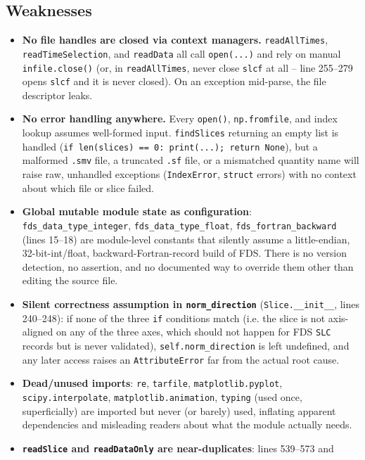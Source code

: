 \documentclass[11pt,a4paper]{report}
\begin{document}
\subsection{Weaknesses}
\begin{itemize}[nosep]
\item \textbf{No file handles are closed via context managers.} \texttt{readAllTimes},
\texttt{readTimeSelection}, and \texttt{readData} all call \texttt{open(...)} and rely on manual
\texttt{infile.close()} (or, in \texttt{readAllTimes}, never close \texttt{slcf} at all --
line 255--279 opens \texttt{slcf} and it is never closed). On an exception mid-parse, the file
descriptor leaks.
\item \textbf{No error handling anywhere.} Every \texttt{open()}, \texttt{np.fromfile}, and index
lookup assumes well-formed input. \texttt{findSlices} returning an empty list is handled
(\texttt{if len(slices) == 0: print(...); return None}), but a malformed \texttt{.smv} file, a
truncated \texttt{.sf} file, or a mismatched quantity name will raise raw, unhandled exceptions
(\texttt{IndexError}, \texttt{struct} errors) with no context about which file or slice failed.
\item \textbf{Global mutable module state as configuration}: \texttt{fds\_data\_type\_integer},
\texttt{fds\_data\_type\_float}, \texttt{fds\_fortran\_backward} (lines 15--18) are module-level
constants that silently assume a little-endian, 32-bit-int/float, backward-Fortran-record build of
FDS. There is no version detection, no assertion, and no documented way to override them other than
editing the source file.
\item \textbf{Silent correctness assumption in \texttt{norm\_direction}} (\texttt{Slice.\_\_init\_\_},
lines 240--248): if none of the three \texttt{if} conditions match (i.e. the slice is not
axis-aligned on any of the three axes, which should not happen for FDS \texttt{SLC} records but is
never validated), \texttt{self.norm\_direction} is left undefined, and any later access raises an
\texttt{AttributeError} far from the actual root cause.
\item \textbf{Dead/unused imports}: \texttt{re}, \texttt{tarfile}, \texttt{matplotlib.pyplot},
\texttt{scipy.interpolate}, \texttt{matplotlib.animation}, \texttt{typing} (used once, superficially)
are imported but never (or barely) used, inflating apparent dependencies and misleading readers about
what the module actually needs.
\item \textbf{\texttt{readSlice} and \texttt{readDataOnly} are near-duplicates}: lines 539--573 and

\end{itemize}
\end{document}
